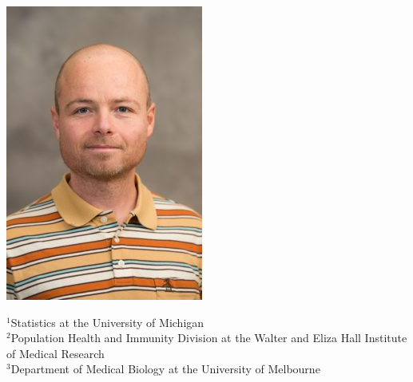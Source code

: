 \documentclass[usenames,dvipsnames,15pt]{beamer}
\begin{document}
{\begin{frame}[noframenumbering]
  \includegraphics[scale=.31]{pictures/johann.jpg}

  \vspace{.25cm}
  {\scriptsize ${}^1$Statistics at the University of Michigan\\
  ${}^2$Population Health and Immunity Division at the Walter and Eliza Hall Institute of Medical Research\\
  ${}^3$Department of Medical Biology at the University of Melbourne}
\end{frame}
}
\end{document}
